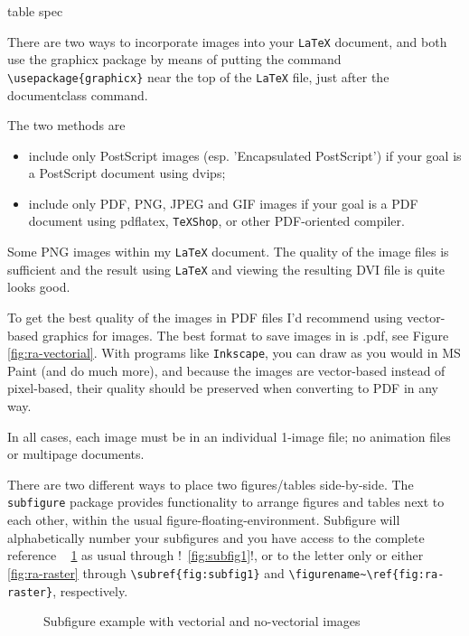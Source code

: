 \begin{tabular}[pos]{table spec}
\begin{sloppypar}
There are two ways to incorporate images into your \texttt{LaTeX} document, and both use the graphicx package by means of putting the command  \verb!\usepackage{graphicx}!  near the top of the \texttt{LaTeX} file, just after the documentclass command.
\end{sloppypar}

The two methods are

\begin{itemize}
\item  include only PostScript images (esp. 'Encapsulated PostScript') if your goal is a PostScript document using dvips;
\item include only PDF, PNG, JPEG and GIF images if your goal is a PDF document using pdflatex, \texttt{TeXShop}, or other PDF-oriented compiler. 
\end{itemize}

Some PNG images within my \texttt{LaTeX} document. The quality of the image files is sufficient and the result using \texttt{LaTeX} and viewing the resulting DVI file is quite looks good.

To get the best quality of the images in  PDF files I'd recommend using vector-based graphics for images. The best format to save images in is .pdf, see Figure \ref{fig:ra-vectorial}. With programs like \texttt{Inkscape}, you can draw as you would in MS Paint (and do much more), and because the images are vector-based instead of pixel-based, their quality should be preserved when converting to PDF in any way.    

In all cases, each image must be in an individual 1-image file; no animation files or multipage documents. 

There are two different ways to place two figures/tables side-by-side. The \texttt{sub\-fi\-gu\-re} package provides functionality to arrange figures and tables next to each other, within the usual figure-floating-environment. Subfigure will alphabetically number your subfigures and you have access to the complete reference \figurename~ \ref{fig:figura-completa} as usual through \spverb!\figurename~\ref{fig:subfig1}!, or  to the letter only or either \figurename~ \ref{fig:ra-raster} through \verb!\subref{fig:subfig1}! and \verb!\figurename~\ref{fig:ra-raster}!, respectively.

\begin{figure}[htbp]
	\centering
\qquad\qquad
  \caption{Subfigure example with vectorial and no-vectorial images}
  \label{fig:figura-completa}
\end{figure}


\end{tabular}
